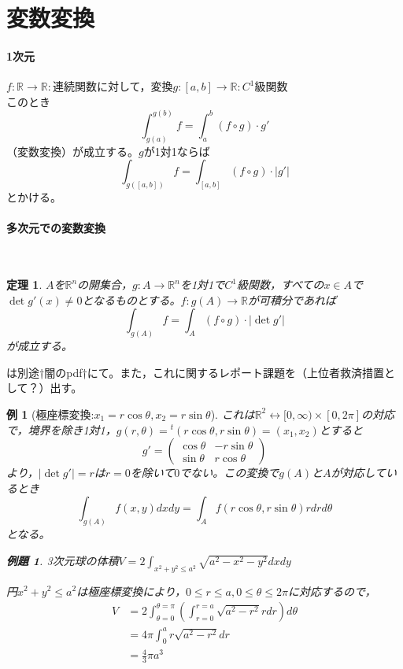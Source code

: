 \documentclass[dvipdfmx,a4j,10pt]{jsarticle}
\makeatletter
\theoremstyle{mystyle1}
\newtheorem{thm}[dfn]{定理}
\theoremstyle{mystyle2}
\newtheorem{ex}{例題}
\newtheorem{example}{例}
\newtheorem{ans}{解答}
\renewenvironment{proof}[1][\proofname]{\par
  \pushQED{\qed}%
  \normalfont
  \topsep6\p@\@plus6\p@ \trivlist
  \item[\hskip\labelsep{\bfseries\sffamily #1}]\ignorespaces
}{%
  \popQED\endtrivlist\@endpefalse
}
\renewcommand\proofname{証明}
\renewenvironment{ans}[1][解答]{\par
  \pushQED{\qed}%
  \normalfont
  \topsep6\p@\@plus6\p@ \trivlist
  \item[\hskip\labelsep{\bfseries\sffamily #1}]\ignorespaces
}{%
  \popQED\endtrivlist\@endpefalse
}
\makeatother
\begin{document}
\section{変数変換}
\paragraph{1次元}
$f:\mathbb{R}\to\mathbb{R}:$連続関数に対して，変換$g:[a,b]\to\mathbb{R}:C^1$級関数\\
このとき
\[
	\int_{g(a)}^{g(b)}f = \int_a^b(f\circ g)\cdot g'
\]
（変数変換）が成立する。$g$が1対1ならば
\[
	\int_{g([a,b])}f=\int_{[a,b]}(f\circ g)\cdot|g'|
\]
とかける。

\paragraph{多次元での変数変換}\

\begin{framed}
	\begin{thm} \label{th3.11}
		$A$を$\mathbb{R}^n$の開集合，$g:A\to\mathbb{R}^n$を1対1で$C^1$級関数，すべての$x\in A$で$\det g'(x)\neq 0$となるものとする。$f:g(A)\to\mathbb{R}$が可積分であれば
		\[
			\int_{g(A)}f=\int_A(f\circ g)\cdot|\det g'|
		\]
		が成立する。
	\end{thm}
\end{framed}

\begin{proof}
	は別途†闇のpdf†にて。また，これに関するレポート課題を（上位者救済措置として？）出す。
\end{proof}

\begin{example}[極座標変換:$x_1=r\cos\theta,x_2=r\sin\theta$]
これは$\mathbb{R}^2\leftrightarrow [0,\infty)\times[0,2\pi]$の対応で，境界を除き1対1，$g(r,\theta)={}^t(r\cos\theta,r\sin\theta)=(x_1,x_2)$とすると
\[
	g'=
	\begin{pmatrix}
	\cos\theta & -r\sin\theta \\
	\sin\theta & r\cos\theta
	\end{pmatrix}
\]
より，$|\det g'|=r$は$r=0$を除いて$0$でない。この変換で$g(A)$と$A$が対応しているとき
\[
	\int_{g(A)}f(x,y)dxdy=\int_A f(r\cos\theta,r\sin\theta)rdrd\theta
\]
となる。
\begin{ex}
	3次元球の体積$\displaystyle V=2\int_{x^2+y^2\leq a^2}\sqrt{a^2-x^2-y^2}dxdy$
\end{ex}

\begin{ans}

円$x^2+y^2\leq a^2$は極座標変換により，$0\leq r\leq a,0\leq \theta\leq 2\pi$に対応するので，
\[
\begin{split}
	V&=2\int_{\theta=0}^{\theta=\pi}\left(\int_{r=0}^{r=a}\sqrt{a^2-r^2}rdr\right)d\theta\\
	&=4\pi\int_0^a r\sqrt{a^2-r^2}dr\\
	&=\frac{4}{3}\pi a^3
\end{split}
\]

\end{ans}

\end{example}
\end{document}

